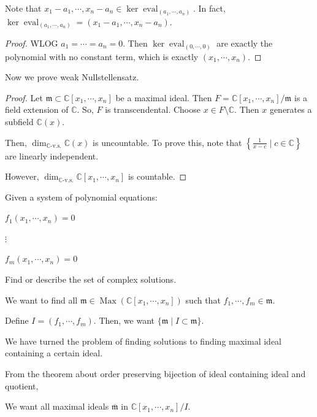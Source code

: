 \documentclass{article}
\theoremstyle{definition}
\begin{document}
    Note that \(x_1 - a_1, \cdots , x_n - a_n\in \ker \operatorname{eval}_{(a_1, \cdots , a_n)}\). In fact, \(\ker \operatorname{eval}_{(a_1, \cdots , a_n)} = (x_1 - a_1, \cdots , x_n - a_n)\).

    \begin{proof}
        WLOG \(a_1 = \cdots = a_n = 0\). Then \(\ker \operatorname{eval}_{(0,\cdots ,0)}\) are exactly the polynomial with no constant term, which is exactly \((x_1, \cdots , x_n)\).
    \end{proof}

    Now we prove weak Nullstellensatz.

    \begin{proof}
        Let \(\mathfrak{m} \subset \mathbb{C} [x_1, \cdots , x_n]\) be a maximal ideal. Then \(F = \mathbb{C}[x_1, \cdots , x_n] / \mathfrak{m}\) is a field extension of \(\mathbb{C}\). So, \(F\) is transcendental. Choose \(x\in F \setminus \mathbb{C}\). Then \(x\) generates a subfield \(\mathbb{C} (x)\).

        Then, \(\dim _{\mathbb{C} \text{-v.s.}} \mathbb{C}(x)\) is uncountable. To prove this, note that \(\left\{ \frac{1}{x-c} \mid c\in \mathbb{C} \right\}\) are linearly independent.
        
        However, \(\dim_{\mathbb{C}\text{-v.s.}} \mathbb{C}[x_1, \cdots, x_n]\) is countable. 
    \end{proof}

    Given a system of polynomial equations:

    \(f_1 (x_1, \cdots , x_n) = 0\)
    
    \(\vdots\)
    
    \(f_m(x_1, \cdots , x_n) = 0\) 

    Find or describe the set of complex solutions.

    We want to find all \(\mathfrak{m} \in \operatorname{Max} (\mathbb{C} [x_1, \cdots , x_n])\) such that \(f_1, \cdots , f_m \in \mathfrak{m}\).

    Define \(I = (f_1, \cdots , f_m)\). Then, we want \(\{ \mathfrak{m} \mid I \subset \mathfrak{m} \}\).

    We have turned the problem of finding solutions to finding maximal ideal containing a certain ideal.

    From the theorem about order preserving bijection of ideal containing ideal and quotient,

    We want all maximal ideals \(\overline{\mathfrak{m}}\) in \(\mathbb{C} [x_1, \cdots , x_n] / I\).
\end{document}
